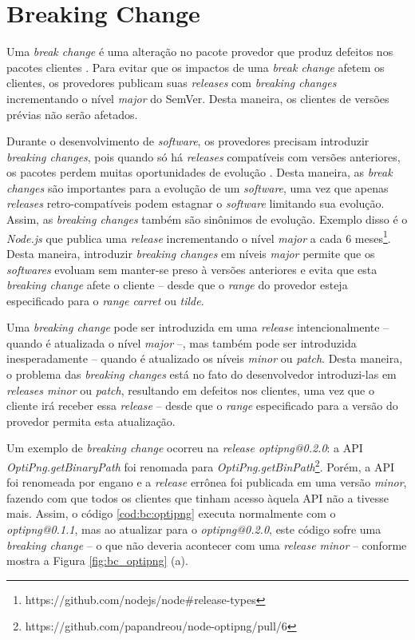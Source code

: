 \section{Breaking Change}
\label{ref-teo:breaking_change}
Uma \textit{break change} é uma alteração no pacote provedor que produz defeitos nos pacotes clientes \cite{teorical_reference:semver}. Para evitar que os impactos de uma \textit{break change} afetem os clientes, os provedores publicam suas \textit{releases} com \textit{breaking changes} incrementando o nível \textit{major} do \gls{SemVer}. Desta maneira, os clientes de versões prévias não serão afetados.

Durante o desenvolvimento de \textit{software}, os provedores precisam introduzir \textit{breaking changes}, pois quando só há \textit{releases} compatíveis com versões anteriores, os pacotes perdem muitas oportunidades de evolução \cite{teorical_reference:bc_2}. Desta maneira, as \textit{break changes} são importantes para a evolução de um \textit{software}, uma vez que apenas \textit{releases} retro-compatíveis podem estagnar o \textit{software} limitando sua evolução. Assim, as \textit{breaking changes} também são sinônimos de evolução. Exemplo disso é o \textit{Node.js} que publica uma \textit{release} incrementando o nível \textit{major} a cada 6 meses\footnote{https://github.com/nodejs/node\#release-types}. Desta maneira, introduzir \textit{breaking changes} em níveis \textit{major} permite que os \textit{softwares} evoluam sem manter-se preso à versões anteriores e evita que esta \textit{breaking change} afete o cliente -- desde que o \textit{range} do provedor esteja especificado para o \textit{range carret} ou \textit{tilde}.

Uma \textit{breaking change} pode ser introduzida em uma \textit{release} intencionalmente -- quando é atualizada o nível \textit{major} --, mas também pode ser introduzida inesperadamente -- quando é atualizado os níveis \textit{minor} ou \textit{patch}. Desta maneira, o problema das \textit{breaking changes} está no fato do desenvolvedor introduzi-las em \textit{releases minor} ou \textit{patch}, resultando em defeitos nos clientes, uma vez que o cliente irá receber essa \textit{release} -- desde que o \textit{range} especificado para a versão do provedor permita esta atualização.

Um exemplo de \textit{breaking change} ocorreu na \textit{release optipng@0.2.0}: a \gls{API} \textit{OptiPng.getBinaryPath} foi renomada para \textit{OptiPng.getBinPath}\footnote{https://github.com/papandreou/node-optipng/pull/6}. Porém, a \gls{API} foi renomeada por engano e a \textit{release} errônea foi publicada em uma versão \textit{minor}, fazendo com que todos os clientes que tinham acesso àquela \gls{API} não a tivesse mais. Assim, o código \ref{cod:bc:optipng} executa normalmente com o \textit{optipng@0.1.1}, mas ao atualizar para o \textit{optipng@0.2.0}, este código sofre uma \textit{breaking change} -- o que não deveria acontecer com uma \textit{release minor}  -- conforme mostra a Figura \ref{fig:bc_optipng} (a).


